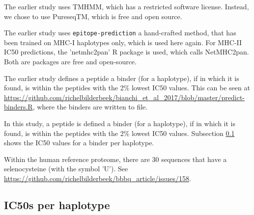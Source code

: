 The earlier study uses TMHMM, which has a restricted software license.
Instead, we chose to use PureseqTM, which is free and open source.




The earlier study uses \verb;epitope-prediction; a hand-crafted method, 
that has been trained on MHC-I haplotypes only,
which is used here again. For MHC-II IC50 predictions, the
'netmhc2pan' R package is used, which calls NetMHC2pan.
Both are packages are free and open-source.


The earlier study defines a peptide a binder (for a haplotype), 
if  in which it is found, 
is within the peptides with the 2\% lowest IC50 values.
This can be seen at \url{https://github.com/richelbilderbeek/bianchi_et_al_2017/blob/master/predict-binders.R},
where the binders are written to file.

In this study, a peptide is defined a binder (for a haplotype), 
if  in which it is found, 
is within the peptides with the 2\% lowest IC50 values.
Subsection \ref{subsec:ic50s_per_haplotype} shows the IC50 values
for a binder per haplotype.


Within the human reference proteome, there are 30 sequences that have a
selenocysteine (with the symbol 'U').
See \url{https://github.com/richelbilderbeek/bbbq_article/issues/158}.

\subsection{IC50s per haplotype}
\label{subsec:ic50s_per_haplotype}

